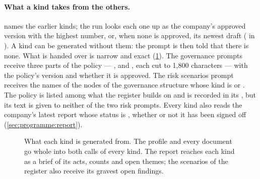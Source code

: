 \paragraph{What a kind takes from the others.}  names the earlier kinds; the run
looks each one up as the company's approved version with the highest number, or, when none is
approved, its newest draft ( in ). A kind can be
generated without them: the prompt is then told that there is none. What is handed over is
narrow and exact (\cref{fig:programme:builds}). The governance prompts receive three parts of
the policy --- ,  and , each cut to 1,800
characters --- with the policy's version and whether it is approved. The risk scenarios
prompt receives the names of the nodes of the governance structure whose kind is 
or . The policy is listed among what the register builds on and is recorded in
its , but its text is given to neither of the two risk prompts. Every kind also
reads the company's latest report whose status is , whether or not it has been
signed off (\cref{sec:programme:report}).

\begin{figure}[H]
\centering
{}
\caption{What each kind is generated from. The profile and every document go whole into both
calls of every kind. The report reaches each kind as a brief of its acts, counts and open
themes; the scenarios of the register also receive its gravest open findings.}\label{fig:programme:builds}
\end{figure}

